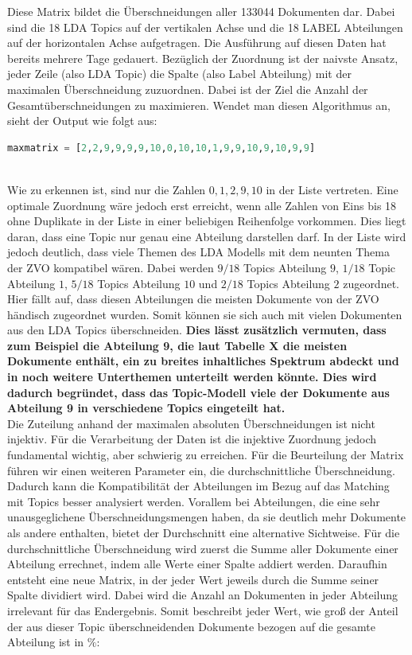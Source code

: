 \documentclass[german,version-2020-11]{uzl-thesis}
\begin{document}
\begin{enumerate}
Diese Matrix bildet die Überschneidungen aller 133044 Dokumenten dar. Dabei sind die 18 LDA Topics auf der vertikalen Achse und die 18 LABEL Abteilungen auf der horizontalen Achse aufgetragen. Die Ausführung auf diesen Daten hat bereits mehrere Tage gedauert. Bezüglich der Zuordnung ist der naivste Ansatz, jeder Zeile (also LDA Topic) die Spalte (also Label Abteilung) mit der maximalen Überschneidung zuzuordnen. Dabei ist der Ziel die Anzahl der Gesamtüberschneidungen zu maximieren. Wendet man diesen Algorithmus an, sieht der Output wie folgt aus: \\

\begin{lstlisting}[language=Python]
maxmatrix = [2,2,9,9,9,9,10,0,10,10,1,9,9,10,9,10,9,9]
\end{lstlisting}\\

Wie zu erkennen ist, sind nur die Zahlen $ 0,1,2,9,10 $ in der Liste vertreten. Eine optimale Zuordnung wäre jedoch erst erreicht, wenn alle Zahlen von Eins bis 18 ohne Duplikate in der Liste in einer beliebigen Reihenfolge vorkommen. Dies liegt daran, dass eine Topic nur genau eine Abteilung darstellen darf. In der Liste wird jedoch deutlich, dass viele Themen des LDA Modells mit dem neunten Thema der ZVO kompatibel wären. Dabei werden $9/18$ Topics Abteilung $9$, $1/18$ Topic Abteilung $1$, $5/18$ Topics Abteilung $10$ und $2/18$ Topics Abteilung $2$ zugeordnet. Hier fällt auf, dass diesen Abteilungen die meisten Dokumente von der ZVO händisch zugeordnet wurden. Somit können sie sich auch mit vielen Dokumenten aus den LDA Topics überschneiden. \textbf{Dies lässt zusätzlich vermuten, dass zum Beispiel die Abteilung 9, die laut Tabelle X die meisten Dokumente enthält, ein zu breites inhaltliches Spektrum abdeckt und in noch weitere Unterthemen unterteilt werden könnte. Dies wird dadurch begründet, dass das Topic-Modell viele der Dokumente aus Abteilung 9 in verschiedene Topics eingeteilt hat.}\\


Die Zuteilung anhand der maximalen absoluten Überschneidungen ist nicht injektiv. Für die Verarbeitung der Daten ist die injektive Zuordnung jedoch fundamental wichtig, aber schwierig zu erreichen. Für die Beurteilung der Matrix führen wir einen weiteren Parameter ein, die durchschnittliche Überschneidung. Dadurch kann die Kompatibilität der Abteilungen im Bezug auf das Matching mit Topics besser analysiert werden. Vorallem bei Abteilungen, die eine sehr unausgeglichene Überschneidungsmengen haben, da sie deutlich mehr Dokumente als andere enthalten, bietet der Durchschnitt eine alternative Sichtweise. Für die durchschnittliche Überschneidung wird zuerst die Summe aller Dokumente einer Abteilung errechnet, indem alle Werte einer Spalte addiert werden. Daraufhin entsteht eine neue Matrix, in der jeder Wert jeweils durch die Summe seiner Spalte dividiert wird. Dabei wird die Anzahl an Dokumenten in jeder Abteilung irrelevant für das Endergebnis. Somit beschreibt jeder Wert, wie groß der Anteil der aus dieser Topic überschneidenden Dokumente bezogen auf die gesamte Abteilung ist in $\%$: \\


\end{enumerate}
\end{document}

